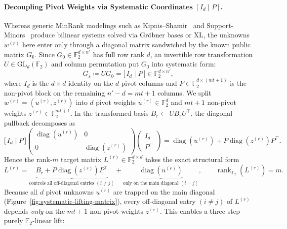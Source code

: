 \documentclass[11pt,a4paper]{article}
\theoremstyle{definition}
\theoremstyle{remark}
\newcommand{\F}{\mathbb{F}}
\newcommand{\rk}{\operatorname{rank}}
\newcommand{\diag}{\operatorname{diag}}
\begin{document}
\paragraph{Decoupling Pivot Weights via Systematic Coordinates $[I_d \mid P]$.}
Whereas generic MinRank modelings such as Kipnis--Shamir~\cite{KS99} and Support-Minors~\cite{BBC20} produce bilinear systems solved via Gr\"{o}bner bases or XL, the unknowns $w^{(r)}$ here enter only through a diagonal matrix sandwiched by the known public matrix $G_0$. Since $G_0 \in \F_2^{d \times n'}$ has full row rank $d$, an invertible row transformation $U \in \mathrm{GL}_d(\F_2)$ and column permutation put $G_0$ into systematic form:
\begin{equation}
\label{eq:gs-sys}
    G_s \coloneqq U G_0 = \big[\, I_d \;\big|\; P \,\big] \in \F_2^{d \times n'},
\end{equation}
where $I_d$ is the $d \times d$ identity on the $d$ pivot columns and $P \in \F_2^{d \times (mt+1)}$ is the non-pivot block on the remaining $n' - d = mt + 1$ columns. We split $w^{(r)} = (u^{(r)}, z^{(r)})$ into $d$ pivot weights $u^{(r)} \in \F_2^d$ and $mt + 1$ non-pivot weights $z^{(r)} \in \F_2^{mt+1}$. In the transformed basis $B_r \leftarrow U B_r U^\top$, the diagonal pullback decomposes as
\[
    \big[\, I_d \;\big|\; P \,\big]
    \begin{pmatrix} \diag(u^{(r)}) & 0 \\ 0 & \diag(z^{(r)}) \end{pmatrix}
    \begin{pmatrix} I_d \\ P^\top \end{pmatrix}
    = \diag(u^{(r)}) + P \diag(z^{(r)}) P^\top.
\]
Hence the rank-$m$ target matrix $L^{(r)} \in \F_2^{d \times d}$ takes the exact structural form
\begin{equation}
\label{eq:lifted-form}
    L^{(r)} = \underbrace{B_r + P \diag(z^{(r)}) P^\top}_{\text{controls all off-diagonal entries } (i \neq j)} + \underbrace{\diag(u^{(r)})}_{\text{only on the main diagonal }(i = j)},
    \qquad \rk_{\F_2}(L^{(r)}) = m.
\end{equation}
Because all $d$ pivot unknowns $u^{(r)}$ are trapped on the main diagonal (Figure~\ref{fig:systematic-lifting-matrix}), every off-diagonal entry $(i \neq j)$ of $L^{(r)}$ depends \emph{only} on the $mt + 1$ non-pivot weights $z^{(r)}$. This enables a three-step purely $\F_2$-linear lift:
\end{document}
